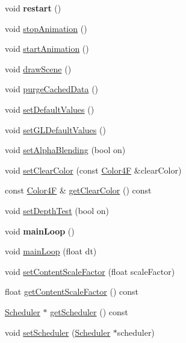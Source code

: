 \begin{DoxyCompactItemize}
\item 
\mbox{\label{classDirector_a4043394eae66baf0f307121e442610d1}} 
void {\bfseries restart} ()
\item 
void \hyperlink{classDirector_a436d0f15a1cf160cb72a64edc2df217c}{stop\+Animation} ()
\item 
void \hyperlink{classDirector_ae194a51e690fc6e1a6334a6a83da5b2e}{start\+Animation} ()
\item 
void \hyperlink{classDirector_a9ab4f229ddfcf735ded9b8f25e091481}{draw\+Scene} ()
\item 
void \hyperlink{classDirector_aed3733d86c85ee8d1f4966801ba5ad19}{purge\+Cached\+Data} ()
\item 
void \hyperlink{classDirector_a55475c9785f74187a7d337d117224953}{set\+Default\+Values} ()
\item 
void \hyperlink{classDirector_a7271f672c2afb904023fe0510fbe215f}{set\+G\+L\+Default\+Values} ()
\item 
void \hyperlink{classDirector_a405b60d715c4828cc4541dfc5c34c04f}{set\+Alpha\+Blending} (bool on)
\item 
void \hyperlink{classDirector_a50fe8a47a3b94dc42366099e5862de40}{set\+Clear\+Color} (const \hyperlink{structColor4F}{Color4F} \&clear\+Color)
\item 
const \hyperlink{structColor4F}{Color4F} \& \hyperlink{classDirector_a980149bba5adee4a719c7a6e6accc810}{get\+Clear\+Color} () const
\item 
void \hyperlink{classDirector_a24a276dd9029d03e564c07750872aef6}{set\+Depth\+Test} (bool on)
\item 
\mbox{\label{classDirector_a478075cd9b7e11f6c45e2e8929daa823}} 
void {\bfseries main\+Loop} ()
\item 
void \hyperlink{classDirector_aecddf44c9b1734615a3a71d7d010588a}{main\+Loop} (float dt)
\item 
void \hyperlink{classDirector_a0eef2543f7619fc1539a22b6cfe42acb}{set\+Content\+Scale\+Factor} (float scale\+Factor)
\item 
float \hyperlink{classDirector_a233085ea94b316a44313e4120029f2a4}{get\+Content\+Scale\+Factor} () const
\item 
\hyperlink{classScheduler}{Scheduler} $\ast$ \hyperlink{classDirector_a9deefa201b7826b4c9960c85a4fa7022}{get\+Scheduler} () const
\item 
void \hyperlink{classDirector_a8e802ef200191e7b6e92b08b37c81e4d}{set\+Scheduler} (\hyperlink{classScheduler}{Scheduler} $\ast$scheduler)

\end{DoxyCompactItemize}
